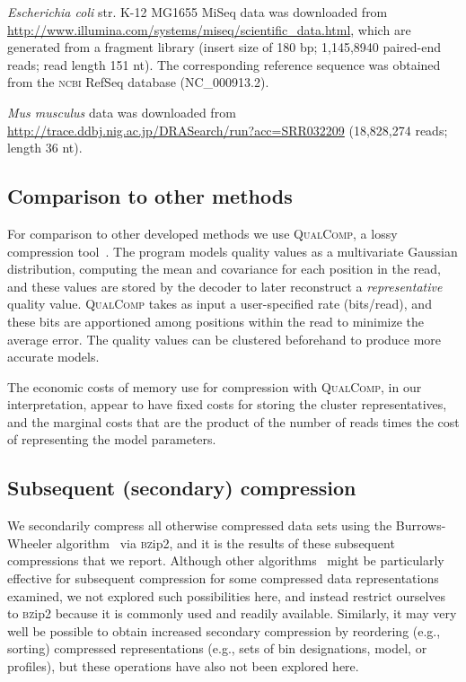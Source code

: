 \documentclass{bioinfo}
\begin{document}
\begin{methods}
\textit{Escherichia coli} str. K-12 MG1655 MiSeq data was downloaded
from \url{http://www.illumina.com/systems/miseq/scientific_data.html},
which are generated from a fragment library (insert size of 180 bp;
1,145,8940 paired-end reads; read length 151 nt). The corresponding
reference sequence was obtained from the \textsc{ncbi} RefSeq database
(NC\_000913.2).

\textit{Mus musculus} data was downloaded from
\url{http://trace.ddbj.nig.ac.jp/DRASearch/run?acc=SRR032209}
(18,828,274 reads; length 36 nt).

\subsection{Comparison to other methods}

For comparison to other developed methods we use \textsc{QualComp}, a
lossy compression tool~\citep{Ochoa:2013rt}. The program models
quality values as a multivariate Gaussian distribution, computing the
mean and covariance for each position in the read, and these values
are stored by the decoder to later reconstruct a \emph{representative}
quality value. \textsc{QualComp} takes as input a user-specified rate
(bits/read), and these bits are apportioned among positions within the
read to minimize the average error. The quality values can be
clustered beforehand to produce more accurate models.

The economic costs of memory use for compression with
\textsc{QualComp}, in our interpretation, appear to have fixed costs
for storing the cluster representatives, and the marginal costs that
are the product of the number of reads times the cost of representing
the model parameters.

\subsection{Subsequent (secondary) compression}

We secondarily compress all otherwise compressed data sets using the
Burrows-Wheeler algorithm~\citep{bwt} via \textsc{bz}ip2, and it is
the results of these subsequent compressions that we report. Although
other algorithms~\cite[e.g.,][]{HUFFMAN:1952nr,Ziv77auniversal,
  DBLP:journals/tit/ZivL78} might be particularly effective for
subsequent compression for some compressed data representations
examined, we not explored such possibilities here, and instead
restrict ourselves to \textsc{bz}ip2 because it is commonly used and
readily available. Similarly, it may very well be possible to obtain
increased secondary compression by reordering (e.g., sorting)
compressed representations (e.g., sets of bin designations, model, or
profiles), but these operations have also not been explored here.


\end{methods}
\end{document}
